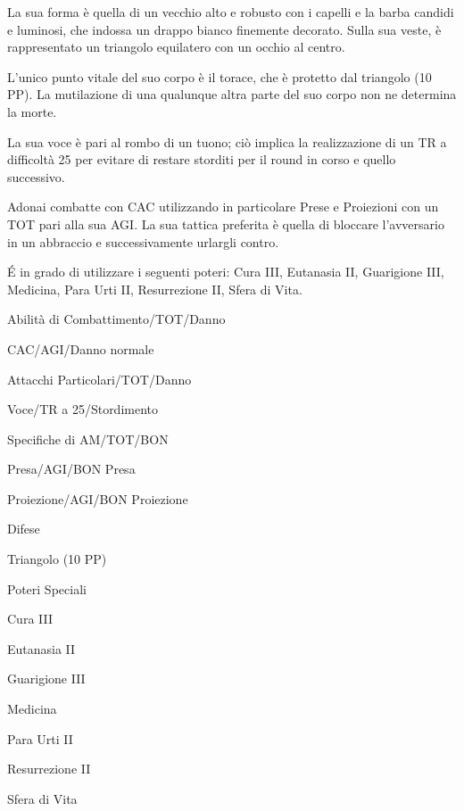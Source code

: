
La sua forma \`e quella di un vecchio alto e robusto con i capelli e
la barba candidi e luminosi, che indossa un drappo bianco finemente
decorato. Sulla sua veste, \`e rappresentato un triangolo equilatero
con un occhio al centro.

L'unico punto vitale del suo corpo \`e il torace, che \`e protetto
dal triangolo (10 PP). La mutilazione di una qualunque altra parte del
suo corpo non ne determina la morte.

La sua voce \`e pari al rombo di un tuono; ci\`o implica la
realizzazione di un TR a difficolt\`a 25 per evitare di restare
storditi per il round in corso e quello successivo.


Adonai combatte con CAC utilizzando in particolare Prese e Proiezioni
con un TOT pari alla sua AGI. La sua tattica preferita \`e quella di
bloccare l'avversario in un abbraccio e successivamente urlargli
contro.

\'E in grado di utilizzare i seguenti poteri: Cura III, Eutanasia II,
Guarigione III, Medicina, Para Urti II, Resurrezione II, Sfera di
Vita.


\begin{parmostro}{Abilit\`a di Combattimento/TOT/Danno}
\item CAC/AGI/Danno normale
\end{parmostro}

\begin{parmostro}{Attacchi Particolari/TOT/Danno}
\item Voce/TR a 25/Stordimento
\end{parmostro}

\begin{parmostro}{Specifiche di AM/TOT/BON}
\item Presa/AGI/BON Presa
\item  Proiezione/AGI/BON Proiezione
\end{parmostro}

\begin{parmostro}{Difese}
\item Triangolo (10 PP)
\end{parmostro}

\begin{parmostro}{Poteri Speciali}
\item Cura III
\item Eutanasia II
\item Guarigione III
\item Medicina
\item Para Urti II
\item Resurrezione II
\item Sfera di Vita
\end{parmostro}

